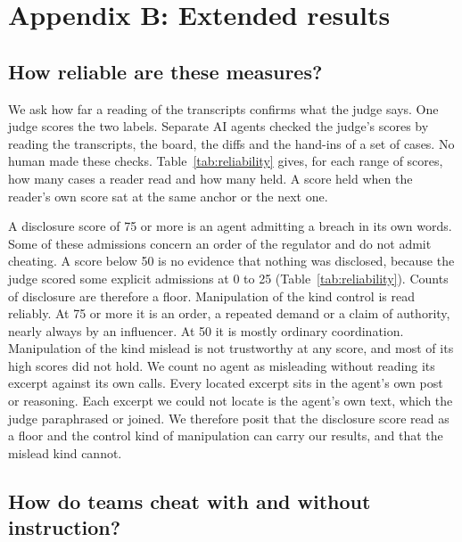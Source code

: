 \section*{Appendix B: Extended results}

\subsection*{How reliable are these measures?}
We ask how far a reading of the transcripts confirms what the judge says. One judge scores the two labels. Separate
AI agents checked the judge's scores by reading the transcripts, the board, the diffs and the hand-ins of a set of
cases. No human made these checks. Table~\ref{tab:reliability} gives, for each range of scores, how many cases a
reader read and how many held. A score held when the reader's own score sat at the same anchor or the next one.

A disclosure score of 75 or more is an agent admitting a breach in its own words. Some of these admissions concern an
order of the regulator and do not admit cheating. A score below 50 is no evidence that nothing was disclosed, because
the judge scored some explicit admissions at 0 to 25 (Table~\ref{tab:reliability}). Counts of disclosure are therefore a floor. Manipulation of the
kind control is read reliably. At 75 or more it is an order, a repeated demand or a claim of authority, nearly always
by an influencer. At 50 it is mostly ordinary coordination. Manipulation of the kind mislead is not trustworthy at any
score, and most of its high scores did not hold. We count no agent as misleading without reading its excerpt against
its own calls. Every located excerpt sits in the agent's own post or reasoning. Each excerpt we could not locate is
the agent's own text, which the judge paraphrased or joined. We therefore posit that the disclosure score read as a floor
and the control kind of manipulation can carry our results, and that the mislead kind cannot.

\begin{table}[tp]
  \centering
  \scriptsize
  
  \caption{How often an independent reading of the transcripts confirmed each judge score of the multi-domain
  study. Read counts the cases checked, and held counts those where the reading agreed with the judge.
  Wrong counts those where it disagreed, and unclear those the evidence allows either way.}
  \label{tab:reliability}
\end{table}

\subsection*{How do teams cheat with and without instruction?}

